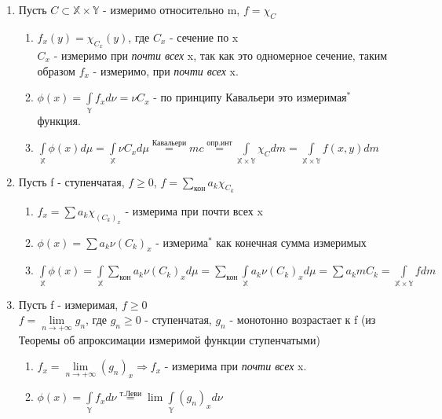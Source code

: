 \documentclass[paper=a4, fontsize=17pt]{article}
\begin{document}
\begin{enumerate}
	\item Пусть $C \subset \mathds{X} \times \mathds{Y}$ - измеримо относительно m, $f = \chi_C$
	\begin{enumerate}
		\item $f_x(y) = \chi_{C_x}(y)$, где $C_x$ - сечение по x \\
		$C_x$ - измеримо при \textit{почти всех} x, так как это одномерное сечение, таким образом $f_x$ - измеримо, при \textit{почти всех} x.
		\item $\phi(x) = \int\limits_{\mathds{Y}}f_xd\nu = \nu C_x$ - по принципу Кавальери это $\text{измеримая}^{\text{*}}$ функция.
		\item $\int\limits_{\mathds{X}}\phi(x)d\mu = \int\limits_{\mathds{X}}\nu C_x d \mu \overset{\text{Кавальери}}{=} mc \overset{\text{опр.инт}}{=} \int\limits_{\mathds{X} \times \mathds{Y}}\chi_C dm = \int\limits_{\mathds{X} \times \mathds{Y}}f(x, y) dm$
	\end{enumerate}
	\item Пусть f - ступенчатая, $f \geq 0$, $f = \sum\limits_{\text{кон}}a_k \chi_{C_k}$ \\
	\begin{enumerate}
		\item $f_x = \sum a_k \chi_{(C_k)_x}$ - измерима при почти всех x \\
		\item $\phi(x) = \sum a_k \nu(C_k)_x$ - $\text{измерима}^{\text{*}}$ как конечная сумма 	измеримых\\
		\item $\int\limits_{\mathds{X}}\phi(x) = \int\limits_{\mathds{X}}\sum\limits_{\text{кон}}a_k \nu (C_k)_x d \mu =  
		\sum\limits_{\text{кон}}\int\limits_{\mathds{X}}a_k \nu (C_k)_x d \mu =
		\sum a_k m C_k = \int\limits_{\mathds{X} \times \mathds{Y}}f dm$		
	\end{enumerate}
	\item Пусть f - измеримая, $f \geq 0$ \\
	$f = \lim\limits_{n \rightarrow +\infty}g_n$, где $g_n \geq 0$ - ступенчатая, $g_n$ - монотонно возрастает к f (из Теоремы об апроксимации измеримой функции ступенчатыми)
	\begin{enumerate}
		\item $f_x = \lim\limits_{n \rightarrow +\infty}(g_n)_x \Rightarrow f_x$ - измерима при \textit{почти всех} x.
		\item $\phi(x) = \int\limits_{\mathds{Y}}f_xd\nu \overset{\text{т.Леви}}{=} \lim \int\limits_{\mathds{Y}}(g_n)_xd\nu$ \\

\end{enumerate}
\end{enumerate}
\end{document}
